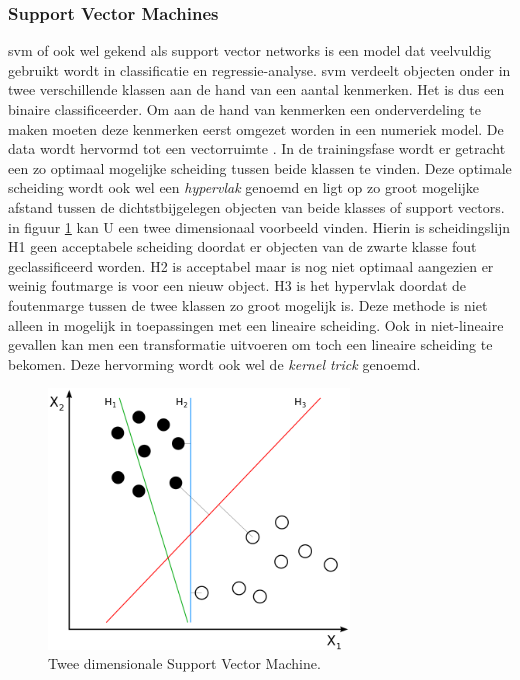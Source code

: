 	\subsubsection{Support Vector Machines}
	\gls{svm} of ook wel gekend als support vector networks is een model dat veelvuldig gebruikt wordt in classificatie en regressie-analyse. \gls{svm} verdeelt objecten onder in twee verschillende klassen aan de hand van een aantal kenmerken. Het is dus een binaire classificeerder. Om aan de hand van kenmerken een onderverdeling te maken moeten deze kenmerken eerst omgezet worden in een numeriek model. De data wordt hervormd tot een vectorruimte . In de trainingsfase wordt er getracht een zo optimaal mogelijke scheiding tussen beide klassen te vinden. Deze optimale scheiding wordt ook wel een \textit{hypervlak} genoemd en ligt op zo groot mogelijke afstand tussen de dichtstbijgelegen objecten van beide klasses of support vectors. in figuur \ref{fig:supportVectorMachines} kan U een twee dimensionaal voorbeeld vinden. Hierin is scheidingslijn H1 geen acceptabele scheiding doordat er objecten van de zwarte klasse fout geclassificeerd worden. H2 is acceptabel maar is nog niet optimaal aangezien er weinig foutmarge is voor een nieuw object. H3 is het hypervlak doordat de foutenmarge tussen de twee klassen zo groot mogelijk is. Deze methode is niet alleen in mogelijk in toepassingen met een lineaire scheiding. Ook in niet-lineaire gevallen kan men een transformatie uitvoeren om toch een lineaire scheiding te bekomen. Deze hervorming wordt ook wel de \textit{kernel trick} genoemd. 
	
	
	\begin{figure}
		\centering
		\includegraphics[width=80mm]{afbeeldingen/supportVectorMachines.PNG}
		\caption{Twee dimensionale Support Vector Machine.}
		\label{fig:supportVectorMachines}
	\end{figure}
